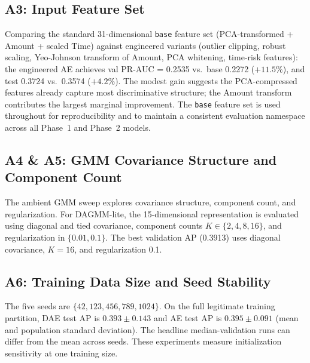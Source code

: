 \subsection{A3: Input Feature Set}
\label{sec:abl_features}

Comparing the standard 31-dimensional \texttt{base} feature set (PCA-transformed + Amount + scaled Time) against engineered variants (outlier clipping, robust scaling, Yeo-Johnson transform of Amount, PCA whitening, time-risk features): the engineered AE achieves val PR-AUC = 0.2535 vs.\ base 0.2272 ($+11.5\%$), and test 0.3724 vs.\ 0.3574 ($+4.2\%$). The modest gain suggests the PCA-compressed features already capture most discriminative structure; the Amount transform contributes the largest marginal improvement. The \texttt{base} feature set is used throughout for reproducibility and to maintain a consistent evaluation namespace across all Phase~1 and Phase~2 models.

\subsection{A4 \& A5: GMM Covariance Structure and Component Count}
\label{sec:abl_gmm}

The ambient GMM sweep explores covariance structure, component count, and regularization. For DAGMM-lite, the 15-dimensional representation is evaluated using diagonal and tied covariance, component counts $K\in\{2,4,8,16\}$, and regularization in $\{0.01,0.1\}$. The best validation AP (0.3913) uses diagonal covariance, $K=16$, and regularization 0.1.

\subsection{A6: Training Data Size and Seed Stability}
\label{sec:abl_training_size}

The five seeds are $\{42,123,456,789,1024\}$. On the full legitimate training partition, DAE test AP is $0.393\pm0.143$ and AE test AP is $0.395\pm0.091$ (mean and population standard deviation). The headline median-validation runs can differ from the mean across seeds. These experiments measure initialization sensitivity at one training size.

